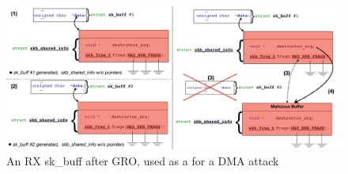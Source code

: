 \begin{figure}[t]
    \centering
    \includegraphics[width=\linewidth]{figs/gro.pdf}
    \caption{An RX sk\_buff after GRO, used as a \means for a DMA attack}
    \label{fig:gro}
\end{figure}

